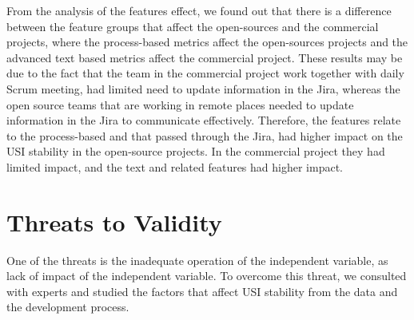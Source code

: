 From the analysis of the features effect, we found out that there is a difference between the feature groups that affect the open-sources and the commercial projects, where the process-based metrics affect the open-sources projects and the advanced text based metrics affect the commercial project.
These results may be due to the fact that the team in the commercial project work together with daily Scrum meeting, had limited need to update information in the Jira, whereas the open source teams that are working in remote places needed to update information in the Jira to communicate effectively. Therefore, the features relate to the process-based and that passed through the Jira, had higher impact on the USI stability in the open-source projects. In the commercial project they had limited impact, and the text and related features had higher impact.   





\section{Threats to Validity}
\label{sec-threattovalidity}

One of the threats is the inadequate operation of the independent variable, as lack of impact of the independent variable. To overcome this threat, we consulted with experts and studied the factors that affect USI stability from the data and the development process.

